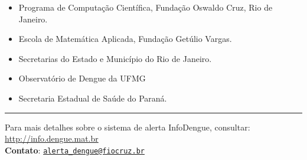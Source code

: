 \documentclass[10pt]{article} %
\begin{document}
\begin{minipage}[t]{1\linewidth}
\begin{itemize}
\item Programa de Computação Científica, Fundação Oswaldo Cruz, Rio de Janeiro.
\item Escola de Matemática Aplicada, Fundação Getúlio Vargas.
\item Secretarias do Estado e Município do Rio de Janeiro.
\item Observatório de Dengue da UFMG
\item Secretaria Estadual de Saúde do Paraná.
\end{itemize}

      \BackToContents %

\vspace{1cm}

\hrule
Para mais detalhes sobre o sistema de alerta InfoDengue, consultar: \url{http://info.dengue.mat.br}\\

\textbf{Contato}: \href{alerta\_dengue@fiocruz.br}{\nolinkurl{alerta\_dengue@fiocruz.br} }
\end{minipage} %
\end{document}
